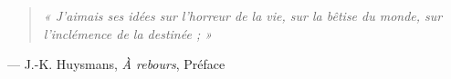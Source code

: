 \thispagestyle{empty}
\vspace*{3\onelineskip}

\begin{quote}
\itshape « J'aimais ses idées sur l'horreur de la vie, sur la bêtise du monde, sur l'inclémence de la destinée ; »
\end{quote}
\begin{flushright}
\normalfont — J.-K. Huysmans, \textit{À rebours}, Préface
\end{flushright}

\cleardoublepage
